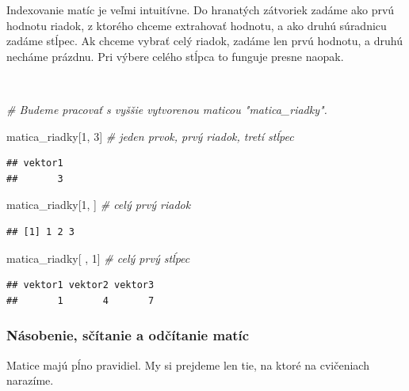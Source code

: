 \documentclass[]{article}
\newenvironment{Shaded}{\begin{snugshade}}{\end{snugshade}}
\newcommand{\CommentTok}[1]{\textcolor[rgb]{0.56,0.35,0.01}{\textit{#1}}}
\newcommand{\DecValTok}[1]{\textcolor[rgb]{0.00,0.00,0.81}{#1}}
\newcommand{\NormalTok}[1]{#1}
\begin{document}
Indexovanie matíc je veľmi intuitívne. Do hranatých zátvoriek zadáme ako
prvú hodnotu riadok, z ktorého chceme extrahovať hodnotu, a ako druhú
súradnicu zadáme stĺpec. Ak chceme vybrať celý riadok, zadáme len prvú
hodnotu, a druhú necháme prázdnu. Pri výbere celého stĺpca to funguje
presne naopak.

~

\begin{Shaded}
\begin{Highlighting}[]
\CommentTok{# Budeme pracovať s vyššie vytvorenou maticou "matica_riadky".}

\NormalTok{matica_riadky[}\DecValTok{1}\NormalTok{, }\DecValTok{3}\NormalTok{] }\CommentTok{# jeden prvok, prvý riadok, tretí stĺpec}
\end{Highlighting}
\end{Shaded}

\begin{verbatim}
## vektor1 
##       3
\end{verbatim}

\begin{Shaded}
\begin{Highlighting}[]
\NormalTok{matica_riadky[}\DecValTok{1}\NormalTok{, ] }\CommentTok{# celý prvý riadok}
\end{Highlighting}
\end{Shaded}

\begin{verbatim}
## [1] 1 2 3
\end{verbatim}

\begin{Shaded}
\begin{Highlighting}[]
\NormalTok{matica_riadky[ , }\DecValTok{1}\NormalTok{] }\CommentTok{# celý prvý stĺpec}
\end{Highlighting}
\end{Shaded}

\begin{verbatim}
## vektor1 vektor2 vektor3 
##       1       4       7
\end{verbatim}

\hypertarget{nuxe1sobenie-sux10duxedtanie-a-odux10duxedtanie-matuxedc}{%
\subsubsection{Násobenie, sčítanie a odčítanie
matíc}\label{nuxe1sobenie-sux10duxedtanie-a-odux10duxedtanie-matuxedc}}

Matice majú pĺno pravidiel. My si prejdeme len tie, na ktoré na
cvičeniach narazíme.
\end{document}
